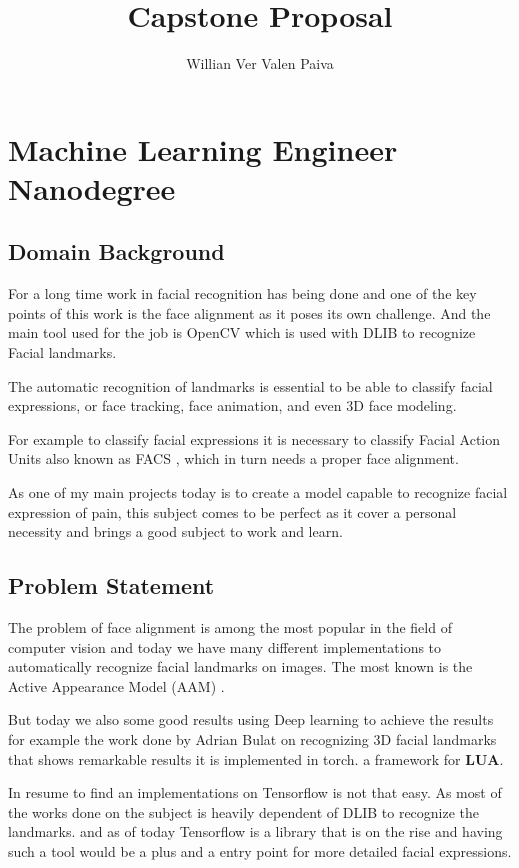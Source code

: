 \documentclass[11pt]{article}
\author{Willian Ver Valen Paiva}
\date{}
\title{Capstone Proposal}
\begin{document}
\maketitle

\section{Machine Learning Engineer Nanodegree}
\label{sec:org76d5988}
\subsection{Domain Background}
\label{sec:org0a4a041}

For a long time work in facial recognition has being done and one of the key
points of this work is the face alignment as it poses its own challenge.
And the main tool used for the job is OpenCV which is used with DLIB to
recognize Facial landmarks.

The automatic recognition of landmarks is essential to be able to classify
facial expressions, or face tracking, face animation, and even 3D face
modeling.

For example to classify facial expressions it is necessary to classify
Facial Action Units also known as FACS \cite{ekman1977facial}, which in turn
needs a proper face alignment.

As one of my main projects today is to create a model capable to recognize
facial expression of pain, this subject comes to be perfect as it cover a
personal necessity and brings a good subject to work and learn.


\subsection{Problem Statement}
\label{sec:orgc779fb9}
The problem of face alignment is among the most popular in the field of
computer vision and today we have many different implementations to
automatically recognize facial landmarks on images.
The most known is the Active Appearance Model (AAM)
\cite{edwards1998face,matthews2004active}.

But today we also some good results using Deep learning to achieve the
results for example the work done by Adrian Bulat on recognizing 3D facial
landmarks \cite{bulat2017far} that shows remarkable results it is implemented in torch.
a framework for \textbf{LUA}.

In resume to find an implementations on Tensorflow is not that easy. As most of the
works done on the subject is heavily dependent of DLIB to recognize the
landmarks. and as of today Tensorflow is a library that is on the rise and having such a
tool would be a plus and a entry point for more detailed facial expressions.
\end{document}
